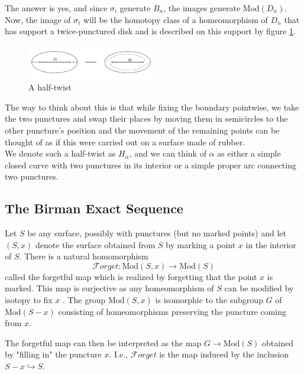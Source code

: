 \documentclass[reqno]{amsart}
\theoremstyle{definition}
\theoremstyle{remark}
\newcommand{\Mod}{{\mathrm{Mod}}}
\newcommand{\Forget}{{\mathcal{F}}orget}
\begin{document}
The answer is yes, and since $\sigma_i$ generate
$B_n$, the images generate $\Mod(D_n)$. Now, the
image of $\sigma_i$ will be the
homotopy class of a homeomorphism
of $D_n$ that has support a twice-punctured disk and is
described on this support by figure \ref{fig:half-twist-png}.

\begin{figure}[htpb]
    \centering
    \includegraphics[width=0.5\textwidth]{half-twist.png}
    \caption{A half-twist}
    \label{fig:half-twist-png}
\end{figure}

The way to think about this is that while fixing the boundary
pointwise, we take the two punctures and swap their places
by moving them in semicircles to the other puncture's position and
the movement of the remaining points can be
thought of as if this were carried out on
a surface made of rubber.\\


We denote such a half-twist as $H_{\alpha}$, and we
can think of $\alpha$ as either a simple closed
curve with two punctures in its interior or a simple
proper arc connecting two punctures.


\subsection{The Birman Exact Sequence}

Let $S$ be any surface, possibly with punctures (but no 
marked points) and let
$\left( S, x \right) $ denote the surface obtained
from $S$ by marking a point $x$ in the
interior of $S$. There is a natural
homomorphism
\[
\Forget \colon \Mod \left( S, x \right) \to \Mod(S)
\] 
called the forgetful map which is realized by forgetting
that the point $x$ is marked. This map is
surjective as any homeomorphism of $S$ can
be modified by isotopy to fix $x$ . The
group $\Mod(S,x)$ is isomorphic to the
subgroup $G$ of $\Mod \left( S - x \right) $ 
consisting of homeomorphisms preserving the
puncture coming from $x$.

The forgetful map can then be interpreted
as the map $G \to \Mod(S)$ obtained by "filling in" the
puncture $x$. I.e., $\Forget$ is the map
induced by the inclusion
 $S -x \hookrightarrow S$.
\end{document}
